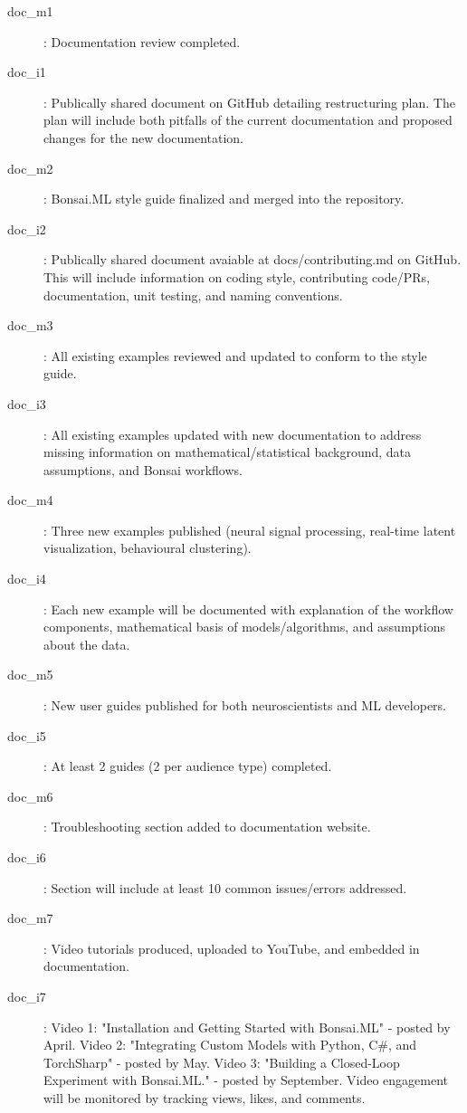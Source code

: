 \begin{description}

    \item[doc\_m1]: Documentation review completed.
    \item[doc\_i1]: Publically shared document on GitHub detailing restructuring plan. The plan will include both pitfalls of the current documentation and proposed changes for the new documentation.
    
    \item[doc\_m2]: Bonsai.ML style guide finalized and merged into the repository.
    \item[doc\_i2]: Publically shared document avaiable at docs/contributing.md on GitHub. This will include information on coding style, contributing code/PRs, documentation, unit testing, and naming conventions.
    
    \item[doc\_m3]: All existing examples reviewed and updated to conform to the style guide.
    \item[doc\_i3]: All existing examples updated with new documentation to address missing information on mathematical/statistical background, data assumptions, and Bonsai workflows.
    
    \item[doc\_m4]: Three new examples published (neural signal processing, real-time latent visualization, behavioural clustering).
    \item[doc\_i4]: Each new example will be documented with explanation of the workflow components, mathematical basis of models/algorithms, and assumptions about the data.
    
    \item[doc\_m5]: New user guides published for both neuroscientists and ML developers.
    \item[doc\_i5]: At least 2 guides (2 per audience type) completed.
    
    \item[doc\_m6]: Troubleshooting section added to documentation website.
    \item[doc\_i6]: Section will include at least 10 common issues/errors addressed.
    
    \item[doc\_m7]: Video tutorials produced, uploaded to YouTube, and embedded in documentation.
    \item[doc\_i7]: Video 1: "Installation and Getting Started with Bonsai.ML" - posted by April. Video 2: "Integrating Custom Models with Python, C#, and TorchSharp" - posted by May. Video 3: "Building a Closed-Loop Experiment with Bonsai.ML." - posted by September. Video engagement will be monitored by tracking views, likes, and comments.

\end{description}

